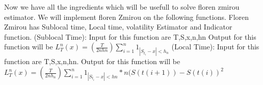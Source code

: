 \begin{enumerate}
Now we have all the ingredients which will be usefull to solve floren zmirou estimator.
We will implement floren Zmirou on the following functions. Floren Zmirou has Sublocal time, Local time, volatility Estimator and Indicator function.
 (Sublocal Time): Input for this function are T,S,x,n,hn
 Output for this function will be $L_{T}^n(x) = (\frac{T}{2nhn}) \sum_{i =1}^ n 1_{\left\vert S_{t_i} - x \right\vert < h_n}$
  (Local Time): Input for this function are T,S,x,n,hn.
 Output for this function will be $L_{T}^n(x) = (\frac{T}{2nh_n}) \sum_{i =1}^ n 1_{\left\vert S_{t_i} - x\right\vert  < hn}*n(S(t(i+1))-S(t(i))^2$

\end{enumerate}
